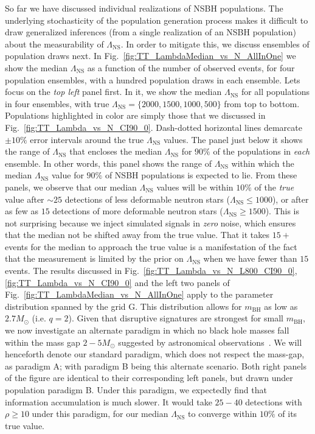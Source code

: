 \documentclass[aps,prd,amsmath,floats,floatfix, twocolumn,
superscriptaddress,nofootinbib,showpacs]{revtex4-1}
\newcommand{\lambdans}{\Lambda_\mathrm{NS}}
\newcommand{\mbh}{m_\mathrm{BH}}
\begin{document}
So far we have discussed individual realizations of NSBH populations. The 
underlying stochasticity of the population generation process makes it
difficult to draw generalized inferences (from a single realization of an
NSBH population) about the measurability of $\lambdans$. In order to mitigate
this, we discuss ensembles of population draws next. In
Fig.~\ref{fig:TT_LambdaMedian_vs_N_AllInOne} we show the median
$\lambdans$ as a function of the number of observed
events, for four population ensembles, with a hundred population draws
in each ensemble. Lets focus on the {\it top left} panel first. In it, we
show the median $\lambdans$ for all populations in four ensembles,
with true $\lambdans=\{2000,1500,1000,500\}$ from top to bottom.
Populations highlighted in color are simply those that we discussed in
Fig.~\ref{fig:TT_Lambda_vs_N_CI90_0}. Dash-dotted horizontal lines
demarcate $\pm10\%$ error intervals around the true $\lambdans$ values.
The panel just below it shows the range of $\lambdans$ that encloses the
median $\lambdans$ for $90\%$ of the populations in {\it each}
ensemble. In other words, this panel shows the range of $\lambdans$ within which
the median $\lambdans$ value for $90\%$ of NSBH populations is
expected to lie. From these panels, we observe that our median $\lambdans$
values will be within $10\%$ of the {\it true} value after $\sim 25$
detections of less deformable neutron stars ($\lambdans\leq 1000$), or
after as few as $15$ detections of more deformable neutron stars
($\lambdans\geq 1500$). This is not surprising because we inject simulated
signals in {\it zero} noise, which ensures that the median not be shifted away
from the true value. That it takes $15+$ events for the median to approach
the true value is a manifestation of the fact that the measurement is limited
by the prior on $\lambdans$ when we have fewer than $15$ events.
% 
The results discussed in Fig.~\ref{fig:TT_Lambda_vs_N_L800_CI90_0},
\ref{fig:TT_Lambda_vs_N_CI90_0} and the left two panels
of Fig.~\ref{fig:TT_LambdaMedian_vs_N_AllInOne} apply to the parameter
distribution spanned by the grid G. This distribution allows for $\mbh$
as low as $2.7M_\odot$ (i.e. $q=2$).
Given that disruptive signatures are strongest for small $\mbh$, we now
investigate an alternate paradigm in which no black hole masses fall within
the mass gap $2-5M_\odot$ suggested by astronomical
observations~\cite{Bailyn:1997xt,Kalogera:1996ci,Kreidberg:2012,
Littenberg:2015tpa}. We will henceforth denote our standard paradigm, which
does not respect the mass-gap, as paradigm A; with paradigm B being
this alternate scenario.
% 
Both right panels of the figure are identical to their corresponding left
panels, but drawn under population paradigm B. Under this paradigm, we
expectedly find that information accumulation is much slower. It would
take $25-40$ detections with $\rho\geq10$ under this paradigm, for our median
$\lambdans$ to converge within $10\%$ of its true value.
\end{document}
